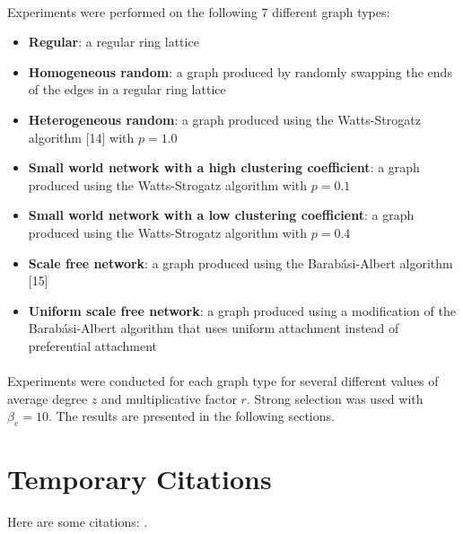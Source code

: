 \documentclass{article}
\begin{document}
	\paragraph{}Experiments were performed on the following 7 different graph types:
	\begin{itemize}
		\item \textbf{Regular}: a regular ring lattice
		\item \textbf{Homogeneous random}: a graph produced by randomly swapping the ends of the edges in a regular ring lattice
		\item \textbf{Heterogeneous random}: a graph produced using the Watts-Strogatz algorithm [14] with $p = 1.0$
		\item \textbf{Small world network with a high clustering coefficient}: a graph produced using the Watts-Strogatz algorithm with $p = 0.1$
		\item \textbf{Small world network with a low clustering coefficient}: a graph produced using the Watts-Strogatz algorithm with $p = 0.4$
		\item \textbf{Scale free network}: a graph produced using the Barab\'{a}si-Albert algorithm [15]
		\item \textbf{Uniform scale free network}: a graph produced using a modification of the Barab\'{a}si-Albert algorithm that uses uniform attachment instead of preferential attachment
	\end{itemize}

	\paragraph{}Experiments were conducted for each graph type for several different values of average degree $z$ and multiplicative factor $r$.  Strong selection was used with $\beta_e=10$.  The results are presented in the following sections.

    \section{Temporary Citations}
    Here are some citations: \cite{Axelrod1981}\cite{Nowak1992}\cite{Hauert2004}\cite{Pacheco2005}\cite{Santos2006b}\cite{Santos2006a}\cite{Santos2005a}\cite{Santos2006c}\cite{Santos2005b}\cite{Eguiluz2005}\cite{Santos2006d}\cite{Fu2008}\cite{Traulsen2006}\cite{Watts1998}\cite{Barabasi1999}\cite{Amaral2000}\cite{Molloy1995}\cite{Maslov2002}\cite{Dorogovtsev2003}\cite{Dorogovtsev2001}\cite{Nowak1998}\cite{Boyd1988}\cite{Boyd1992}\cite{Hauert2002}\cite{Hauert2007}\cite{Li2014}\cite{Maloney2015a}\cite{Ohtsuki2006}\cite{Macy1991}.
    
    
    
\end{document}
